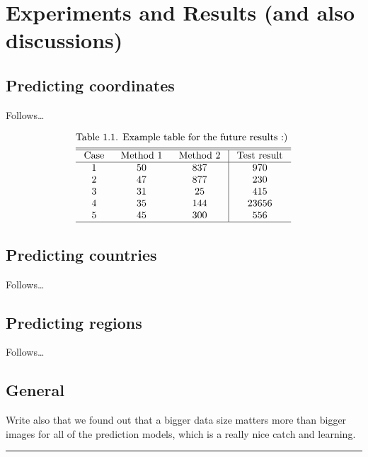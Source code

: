 \documentclass{article}
\begin{document}
\section{Experiments and Results (and also
discussions)}\label{experiments-and-results-and-also-discussions}

\subsection{Predicting coordinates}\label{predicting-coordinates}

Follows\ldots{}

\[
\begin{aligned} & \text {Table 1.1. Example table for the future results :) }\\ &\begin{array}{ccc|c} \hline \hline \text { Case } & \text { Method 1 } & \text { Method 2 } & \text { Test result } \\ \hline 1 & 50 & 837 & 970 \\ 2 & 47 & 877 & 230 \\ 3 & 31 & 25 & 415 \\ 4 & 35 & 144 & 23656 \\ 5 & 45 & 300 & 556 \\ \hline
\end{array} \end{aligned}
\]

\subsection{Predicting countries}\label{predicting-countries}

Follows\ldots{}

\subsection{Predicting regions}\label{predicting-regions}

Follows\ldots{}

\subsection{General}\label{general}

Write also that we found out that a bigger data size matters more than
bigger images for all of the prediction models, which is a really nice
catch and learning.

\begin{center}\rule{0.5\linewidth}{0.5pt}\end{center}
\end{document}
